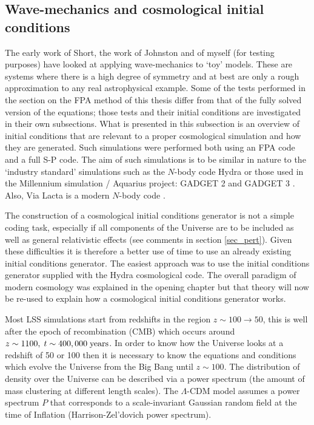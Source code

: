 \subsection{Wave-mechanics and cosmological initial conditions}
\label{cos_init}
The early work of Short, the work of Johnston and of myself (for testing purposes) have looked at applying wave-mechanics to `toy' models. These are systems where there is a high degree of symmetry and at best are only a rough approximation to any real astrophysical example. Some of the tests performed in the section on the FPA method of this thesis differ from that of the fully solved version of the equations; those tests and their initial conditions are investigated in their own subsections. What is presented in this subsection is an overview of initial conditions that are relevant to a proper cosmological simulation and how they are generated. Such simulations were performed both using an FPA code and a full S-P code. The aim of such simulations is to be similar in nature to the `industry standard' simulations such as the $N$-body code Hydra \citep{bib_hmpc1} or those used in the Millennium simulation / Aquarius project: GADGET 2 \citep{bib_mil, bib_spr} and GADGET 3 \citep{bib_aqu}. Also, Via Lacta is a modern $N$-body code \citep{bib_via}.

The construction of a cosmological initial conditions generator is not a simple coding task, especially if all components of the Universe are to be included as well as general relativistic effects (see comments in section \ref{sec_pert}). Given these difficulties it is therefore a better use of time to use an already existing initial conditions generator. The easiest approach was to use the initial conditions generator supplied with the Hydra cosmological code. The overall paradigm of modern cosmology was explained in the opening chapter but that theory will now be re-used to explain how a cosmological initial conditions generator works.

Most LSS simulations start from redshifts in the region $z \sim 100 \rightarrow 50$, this is well after the epoch of recombination (CMB) which occurs around $z \sim 1100, \; t \sim 400,000 \; {\rm years}$. In order to know how the Universe looks at a redshift of 50 or 100 then it is necessary to know the equations and conditions which evolve the Universe from the Big Bang until $z \sim 100$. The distribution of density over the Universe can be described via a power spectrum (the amount of mass clustering at different length scales). The $\Lambda$-CDM model assumes a power spectrum $P$ that corresponds to a scale-invariant Gaussian random field at the time of Inflation (Harrison-Zel'dovich power spectrum).

